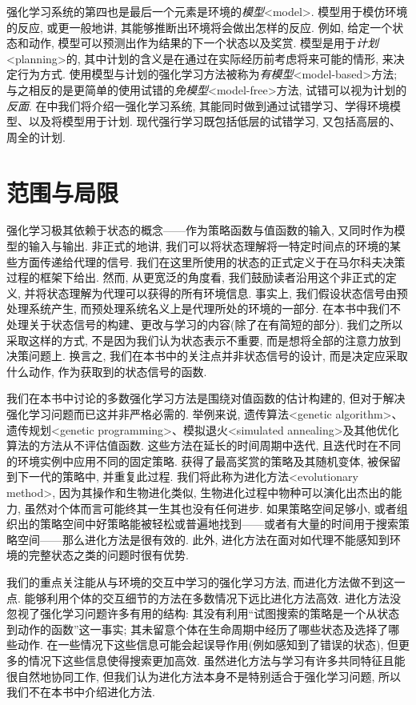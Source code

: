 强化学习系统的第四也是最后一个元素是环境的\emph{模型}<model>. 模型用于模仿环境的反应, 或更一般地讲, 其能够推断出环境将会做出怎样的反应. 例如, 给定一个状态和动作, 模型可以预测出作为结果的下一个状态以及奖赏. 模型是用于\emph{计划}<planning>的, 其中计划的含义是在通过在实际经历前考虑将来可能的情形, 来决定行为方式. 使用模型与计划的强化学习方法被称为\emph{有模型}<model-based>方法; 与之相反的是更简单的使用试错的\emph{免模型}<model-free>方法, 试错可以视为计划的\emph{反面}. 在中我们将介绍一强化学习系统, 其能同时做到通过试错学习、学得环境模型、以及将模型用于计划. 现代强行学习既包括低层的试错学习, 又包括高层的、周全的计划.

\section{范围与局限}\label{sec:1.4}

强化学习极其依赖于状态的概念——作为策略函数与值函数的输入, 又同时作为模型的输入与输出. 非正式的地讲, 我们可以将状态理解将一特定时间点的环境的某些方面传递给代理的信号. 我们在这里所使用的状态的正式定义于在马尔科夫决策过程的框架下给出. 然而, 从更宽泛的角度看, 我们鼓励读者沿用这个非正式的定义, 并将状态理解为代理可以获得的所有环境信息. 事实上, 我们假设状态信号由预处理系统产生, 而预处理系统名义上是代理所处的环境的一部分. 在本书中我们不处理关于状态信号的构建、更改与学习的内容(除了在有简短的部分). 我们之所以采取这样的方式, 不是因为我们认为状态表示不重要, 而是想将全部的注意力放到决策问题上. 换言之, 我们在本书中的关注点并非状态信号的设计, 而是决定应采取什么动作, 作为获取到的状态信号的函数. 

我们在本书中讨论的多数强化学习方法是围绕对值函数的估计构建的, 但对于解决强化学习问题而已这并非严格必需的. 举例来说, 遗传算法<genetic algorithm>、遗传规划<genetic programming>、模拟退火<simulated annealing>及其他优化算法的方法从不评估值函数. 这些方法在延长的时间周期中迭代, 且迭代时在不同的环境实例中应用不同的固定策略. 获得了最高奖赏的策略及其随机变体, 被保留到下一代的策略中, 并重复此过程. 我们将此称为进化方法<evolutionary method>, 因为其操作和生物进化类似, 生物进化过程中物种可以演化出杰出的能力, 虽然对个体而言可能终其一生其也没有任何进步. 如果策略空间足够小, 或者组织出的策略空间中好策略能被轻松或普遍地找到——或者有大量的时间用于搜索策略空间——那么进化方法是很有效的. 此外, 进化方法在面对如代理不能感知到环境的完整状态之类的问题时很有优势.

我们的重点关注能从与环境的交互中学习的强化学习方法, 而进化方法做不到这一点. 能够利用个体的交互细节的方法在多数情况下远比进化方法高效. 进化方法没忽视了强化学习问题许多有用的结构: 其没有利用``试图搜索的策略是一个从状态到动作的函数''这一事实; 其未留意个体在生命周期中经历了哪些状态及选择了哪些动作. 在一些情况下这些信息可能会起误导作用(例如感知到了错误的状态), 但更多的情况下这些信息使得搜索更加高效. 虽然进化方法与学习有许多共同特征且能很自然地协同工作, 但我们认为进化方法本身不是特别适合于强化学习问题, 所以我们不在本书中介绍进化方法.

